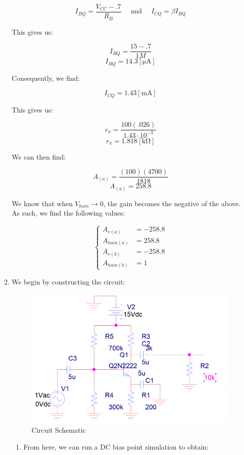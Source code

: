 \begin{enumerate}
    $$I_{BQ}=\frac{V_{CC}-.7}{R_B}\quad\text{ and }\quad I_{CQ}=\beta I_{BQ}$$

    This gives us:

    $$I_{BQ}=\frac{15-.7}{1M}$$
    $$I_{BQ}=14.3[\si{\micro\ampere}]$$

    Consequently, we find:

    $$I_{CQ}=1.43[\si{\milli\ampere}]$$

    This gives us:

    $$r_{\pi}=\frac{100(.026)}{1.43\cdot10^{-3}}$$
    $$r_{\pi}=1.818[\si{\kilo\ohm}]$$

    We can then find:

    $$A_{(a)}=\frac{(100)(4700)}{1818}$$
    $$\boxed{A_{(a)}=258.8}$$

    We know that when $V_{hum}\to 0$, the gain becomes the negative of the above. As such, we find the following values:

    $$\boxed{\left\{\begin{array}{ll} A_{v(a)} &= -258.8\\ A_{hum(a)} &= 258.8\\ A_{v(b)}&= -258.8\\ A_{hum(b)}&= 1\end{array}}$$

  \item We begin by constructing the circuit:

    \begin{figure}[H]
      \centering
      \includegraphics[width=.7\textwidth]{Figures/HW7-3Schem}
      \caption{Circuit Schematic}
      \label{fig:6}
    \end{figure}

    \begin{enumerate}

      \item From here, we can run a DC bias point simulation to obtain:


\end{enumerate}
\end{enumerate}
